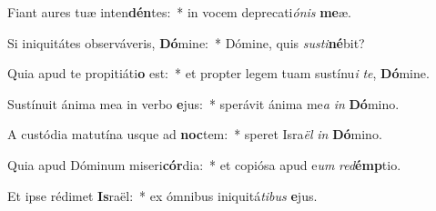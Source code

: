 \item Fiant aures tuæ inten\textbf{dén}tes:~* in vocem deprecati\textit{ó}\textit{nis} \textbf{me}æ.
\item Si iniquitátes observáveris, \textbf{Dó}mine:~* Dómine, quis \textit{sus}\textit{ti}\textbf{né}bit?
\item Quia apud te propitiáti\textbf{o} est:~* et propter legem tuam sustínu\textit{i} \textit{te}, \textbf{Dó}mine.
\item Sustínuit ánima mea in verbo \textbf{e}jus:~* sperávit ánima me\textit{a} \textit{in} \textbf{Dó}mino.
\item A custódia matutína usque ad \textbf{noc}tem:~* speret Isra\textit{ël} \textit{in} \textbf{Dó}mino.
\item Quia apud Dóminum miseri\textbf{cór}dia:~* et copiósa apud e\textit{um} \textit{red}\textbf{émp}tio.
\item Et ipse rédimet \textbf{Is}raël:~* ex ómnibus iniquitá\textit{ti}\textit{bus} \textbf{e}jus.
